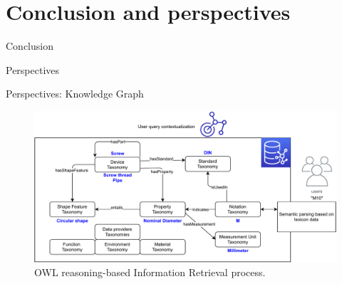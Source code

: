 \section*{Conclusion and perspectives}

\begin{frame}{Conclusion}

\end{frame}

\begin{frame}{Perspectives}

\end{frame}

\begin{frame}{Perspectives: Knowledge Graph}

    \begin{figure} [H]
        \begin{center}
            \includegraphics[scale=0.5]{images/semantic_search_example.pdf} 
            \caption{OWL reasoning-based Information Retrieval process.} 
        \end{center}
    \end{figure}
\end{frame}